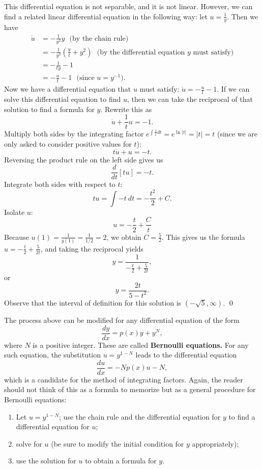 \documentclass[12pt,letterpaper,twoside]{amsart}
\begin{document}
This differential equation is not separable, and it is not linear.  However, we can find a related linear differential equation in the following way: let $u = \frac{1}{y}$.  Then we have
\begin{align*}
\dot{u} 
& = -\frac{1}{y^2} \dot{y} \ \ \ \mbox{(by the chain rule)} \\
& = -\frac{1}{y^2} \left( \frac{y}{t}+y^2 \right) \ \ \ \mbox{(by the differential equation $y$ must satisfy)} \\
& = -\frac{1}{ty} -1 \\
& = -\frac{u}{t}-1 \ \ \ \mbox{(since $u=y^{-1}$)}.
\end{align*}
Now we have a differential equation that $u$ must satisfy: $\dot{u}=-\frac{u}{t}-1$.  If we can solve this differential equation to find $u$, then we can take the reciprocal of that solution to find a formula for $y$. Rewrite this as
\[ \dot{u} + \frac{1}{t} u = -1.\]
Multiply both sides by the integrating factor $e^{\int \frac{1}{t} dt} = e^{\ln |t|}=|t|=t$ (since we are only asked to consider positive values for $t$):
\[ t\dot{u} + u = -t.\]
Reversing the product rule on the left side gives us
\[ \frac{d}{dt} \left[ t u \right] = -t.\]
Integrate both sides with respect to $t$:
\[ t u = \int -t \ dt = -\frac{t^2}{2} + C.\]
Isolate $u$:
\[ u = -\frac{t}{2}+\frac{C}{t}\]
Because $u(1)=\frac{1}{y(1)}=\frac{1}{1/2}=2$, we obtain $C=\frac{5}{2}$.  This gives us the formula $u = -\frac{t}{2}+\frac{5}{2t}$, and taking the reciprocal yields
\[ y = \frac{1}{-\frac{t}{2} + \frac{5}{2t}},\]
or
\[ y = \frac{2t}{5-t^2}.\]
Observe that the interval of definition for this solution is $(-\sqrt{5},\infty)$.
\qed

The process above can be modified for any differential equation of the form
\[ \frac{dy}{dx}=p(x)y+y^N,\]
where $N$ is a positive integer.  These are called {\bf Bernoulli equations.}  For any such equation, the substitution $u=y^{1-N}$ leads to the differential equation
\[ \frac{du}{dx} = -Np(x)u-N,\]
which is a candidate for the method of integrating factors.  Again, the reader should not think of this as a formula to memorize but as a general procedure for Bernoulli equations:
\begin{enumerate}
\item Let $u=y^{1-N}$; use the chain rule and the differential equation for $y$ to find a differential equation for $u$;
\item solve for $u$ (be sure to modify the initial condition for $y$ appropriately);
\item use the solution for $u$ to obtain a formula for $y$.
\end{enumerate}
\end{document}
